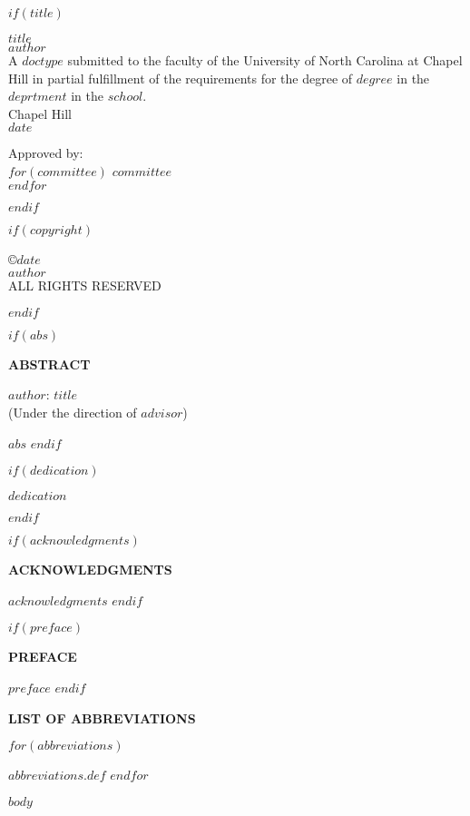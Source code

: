 \documentclass[11pt,letterpaper,oneside]{book}
\renewcommand{\maketitle}{ 
	\singlespacing
	\thispagestyle{empty} 
	\begin{center}
	  \vspace*{0.8125in}
	  {\MakeUppercase{$title$}} \\ \vspace{1in} 
	  \normalsize 
  	$author$ \\ \vspace{1in} 
  	A $doctype$ submitted to the faculty of the University of North Carolina at Chapel Hill in partial fulfillment of the requirements for the degree of $degree$ in the $deprtment$ in the $school$.
  	\vspace{1in}
  	\\ Chapel Hill \\ $date$ \\ 
	\end{center}
	\vspace{1in}
	\hfill
  \begin{minipage}{1.5in} 
      \raggedright
      \doublespacing
      Approved by:\\
      $for(committee)$
        $committee$ \\
      $endfor$
  \end{minipage}
}
\newcommand{\mytwoin}[1]{
\vspace*{0.6875in}
\begin{center}
\bfseries\MakeUppercase{#1}
\end{center}
}
\newcommand{\myonein}[1]{
\begin{center}
\bfseries\MakeUppercase{#1}
\end{center}
}
\begin{document}
\frontmatter

$if(title)$
  \maketitle
$endif$

\pagestyle{plain}
\doublespacing

$if(copyright)$
  \clearpage
  \vspace*{\fill}
  \begin{center}
    \singlespacing
    \copyright $date$ \\
    $author$ \\
    ALL RIGHTS RESERVED
  \end{center}
  \vspace{1in}
$endif$

$if(abs)$
  \clearpage
  \mytwoin{abstract}
  \begin{center}
    \singlespacing
    $author$: $title$ \\ (Under the direction of $advisor$)
  \end{center}
  
  \doublespacing
  $abs$
$endif$

$if(dedication)$
  \clearpage
  \vspace*{0.75in}
  \begin{center}
    $dedication$
  \end{center}
$endif$

$if(acknowledgments)$
  \clearpage
  \mytwoin{Acknowledgments}
  
  $acknowledgments$
$endif$

$if(preface)$
  \clearpage
  \mytwoin{Preface}
  
  $preface$
$endif$

\clearpage

\tableofcontents


\newpage
{}
{}
\listoffigures

\newpage
{}
{}
\listoftables

\newpage
{}
{}
\myonein{List of Abbreviations}
\vspace{14pt}
\begin{multicols}{2}
\begin{description}[font=\normalfont]
$for(abbreviations)$
  \item[$abbreviations.abv$:] $abbreviations.def$
$endfor$
\end{description}
\end{multicols}

\mainmatter

$body$
\end{document}
